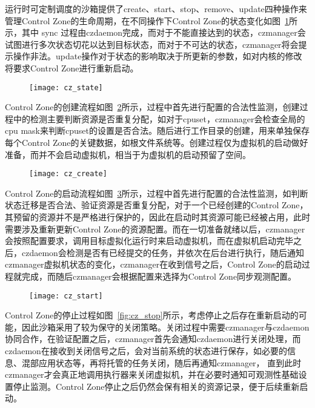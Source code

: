 运行时可定制调度的沙箱提供了create、start、stop、remove、update四种操作来管理Control Zone的生命周期，在不同操作下Control Zone的状态变化如图~\ref{fig:cz_state}所示，其中 sync 过程由czdaemon完成，而对于不能直接达到的状态，czmanager会试图进行多次状态切花以达到目标状态，而对于不可达的状态，czmanager将会提示操作非法。update操作对于状态的影响取决于所更新的参数，如对内核的修改将要求Control Zone进行重新启动。

\begin{figure}[!htbp]
    \centering
    \texttt{[image: cz\_state]}
    \label{fig:cz_state}
\end{figure}

Control Zone的创建流程如图~\ref{fig:cz_create}所示，过程中首先进行配置的合法性监测，创建过程中的检测主要判断资源是否重复分配，如对于cpuset，czmanager会检查全局的cpu mask来判断cpuset的设置是否合法。随后进行工作目录的创建，用来单独保存每个Control Zone的关键数据，如根文件系统等。创建过程仅为虚拟机的启动做好准备，而并不会启动虚拟机，相当于为虚拟机的启动预留了空间。

\begin{figure}[!htbp]
    \centering
    \texttt{[image: cz\_create]}
    \label{fig:cz_create}
\end{figure}

Control Zone的启动流程如图~\ref{fig:cz_start}所示，过程中首先进行配置的合法性监测，如判断状态迁移是否合法、验证资源是否重复分配，对于一个已经创建的Control Zone，其预留的资源并不是严格进行保护的，因此在启动时其资源可能已经被占用，此时需要涉及重新更新Control Zone的资源配置。而在一切准备就绪以后，czmanager会按照配置要求，调用目标虚拟化运行时来启动虚拟机，而在虚拟机启动完毕之后，czdaemon会检测是否有已经提交的任务，并依次在后台进行执行，随后通知czmanager虚拟机状态的变化，czmanager在收到信号之后，Control Zone的启动过程就完成，而随后czmanager会根据配置来选择为Control Zone同步观测配置。

\begin{figure}[!htbp]
        \centering
        \texttt{[image: cz\_start]}
        \label{fig:cz_start}
\end{figure}

Control Zone的停止过程如图~\ref{fig:cz_stop}所示，考虑停止之后存在重新启动的可能，因此沙箱采用了较为保守的关闭策略。关闭过程中需要czmanager与czdaemon协同合作，在验证配置之后，czmanager首先会通知czdaemon进行关闭处理，而czdaemon在接收到关闭信号之后，会对当前系统的状态进行保存，如必要的信息、混部应用状态等，再将托管的任务关闭，随后再通知czmanager， 直到此时czmanager才会真正地调用执行器来关闭虚拟机，并在必要时通知可观测性基础设置停止监测。Control Zone停止之后仍然会保有相关的资源记录，便于后续重新启动。

